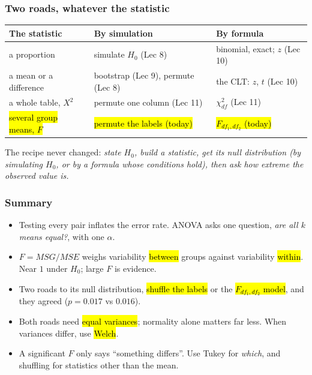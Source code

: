 \documentclass[slidestop,compress,mathserif]{beamer}
\begin{document}
\begin{frame}
\frametitle{Two roads, whatever the statistic}

{\scriptsize
\begin{center}
\setlength{\tabcolsep}{2.5pt}
\begin{tabular}{lll}
\toprule
\textbf{The statistic} & \textbf{By simulation} & \textbf{By formula} \\
\midrule
a proportion & simulate $H_0$ (Lec 8) & binomial, exact; $z$ (Lec 10) \\
a mean or a difference & bootstrap (Lec 9), permute (Lec 8) & the CLT: $z$, $t$ (Lec 10) \\
a whole table, $X^2$ & permute one column (Lec 11) & $\chi^2_{df}$ (Lec 11) \\
\hl{several group means, $F$} & \hl{permute the labels (today)} & \hl{$F_{df_1,df_2}$ (today)} \\
\bottomrule
\end{tabular}
\end{center}}

\vspace{0.3em}
The recipe never changed: \emph{state $H_0$, build a statistic, get its null distribution (by simulating $H_0$, or by a formula whose conditions hold), then ask how extreme the observed value is.}


\end{frame}


\begin{frame}
\frametitle{Summary}

\begin{itemize}
\item Testing every pair inflates the error rate. ANOVA asks one question, \emph{are all $k$ means equal?}, with one $\alpha$.
\item $F = MSG/MSE$ weighs variability \hl{between} groups against variability \hl{within}. Near $1$ under $H_0$; large $F$ is evidence.
\item Two roads to its null distribution, \hl{shuffle the labels} or the \hl{$F_{df_1,df_2}$ model}, and they agreed ($p = 0.017$ vs $0.016$).
\item Both roads need \hl{equal variances}; normality alone matters far less. When variances differ, use \hl{Welch}.
\item A significant $F$ only says ``something differs''. Use Tukey for \emph{which}, and shuffling for statistics other than the mean.
\end{itemize}

\end{frame}
\end{document}
